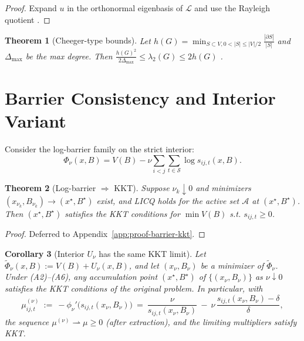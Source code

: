 \documentclass[11pt]{article}
\newtheorem{theorem}{Theorem}[section]
\newtheorem{corollary}[theorem]{Corollary}
\theoremstyle{remark}
\theoremstyle{definition}
\newcommand{\ShiftSet}{\mathcal{S}}            %
\begin{document}
\begin{proof}
Expand $u$ in the orthonormal eigenbasis of $\mathcal{L}$ and use the Rayleigh quotient \cite{Fiedler73}.
\end{proof}

\begin{theorem}[Cheeger-type bounds]\label{thm:cheeger}
Let $h(G)=\min_{S\subset V,0<|S|\le |V|/2} \frac{|\partial S|}{|S|}$ and $\Delta_{\max}$ be the max degree. Then
$\frac{h(G)^2}{2\Delta_{\max}}\le \lambda_2(G)\le 2h(G)$ \cite{AlonMilman85,Mohar89,Buser82}.
\end{theorem}

\section{Barrier Consistency and Interior Variant}\label{sec:barrier-consistency}
Consider the log-barrier family on the strict interior:
\begin{equation}\label{eq:ip}
\Phi_\nu(x,B)=V(B)-\nu \sum_{i<j}\sum_{t\in\ShiftSet} \log s_{ij,t}(x,B).
\end{equation}

\begin{theorem}[Log-barrier $\Rightarrow$ KKT]\label{thm:barrier-consistency}
Suppose $\nu_k\downarrow 0$ and minimizers $(x_{\nu_k},B_{\nu_k})\to(x^\star,B^\star)$ exist, and LICQ holds for the active set $\mathcal{A}$ at $(x^\star,B^\star)$. Then $(x^\star,B^\star)$ satisfies the KKT conditions for $\min V(B)$ s.t. $s_{ij,t}\ge 0$.
\end{theorem}

\begin{proof}
Deferred to Appendix~\ref{app:proof-barrier-kkt}.
\end{proof}

\begin{corollary}[Interior $U_\nu$ has the same KKT limit]\label{cor:Unu-KKT}
Let $\widetilde{\Phi}_\nu(x,B):=V(B)+U_\nu(x,B)$, and let $(x_\nu,B_\nu)$ be a minimizer of $\widetilde{\Phi}_\nu$. Under (A2)--(A6), any accumulation point $(x^\star,B^\star)$ of $\{(x_\nu,B_\nu)\}$ as $\nu\downarrow 0$ satisfies the KKT conditions of the original problem. In particular, with
\[
\mu^{(\nu)}_{ij,t}\ :=\ -\phi_\nu'\!\bigl(s_{ij,t}(x_\nu,B_\nu)\bigr)\ =\ \frac{\nu}{s_{ij,t}(x_\nu,B_\nu)}\ -\ \nu\,\frac{s_{ij,t}(x_\nu,B_\nu)-\delta}{\delta},
\]
the sequence $\mu^{(\nu)}\rightharpoonup \mu\ge 0$ (after extraction), and the limiting multipliers satisfy KKT.
\end{corollary}
\end{document}
